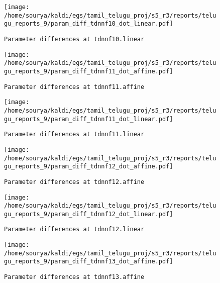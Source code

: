 \documentclass[prl,10pt,twocolumn]{revtex4}
\begin{document}
\newpage
\begin{figure}[h]
  \begin{center}
    \caption{\texttt{Parameter differences at tdnnf10.linear}}
    \texttt{[image: /home/sourya/kaldi/egs/tamil\_telugu\_proj/s5\_r3/reports/telugu\_reports\_9/param\_diff\_tdnnf10\_dot\_linear.pdf]}
  \end{center}
\end{figure}
\clearpage


\newpage
\begin{figure}[h]
  \begin{center}
    \caption{\texttt{Parameter differences at tdnnf11.affine}}
    \texttt{[image: /home/sourya/kaldi/egs/tamil\_telugu\_proj/s5\_r3/reports/telugu\_reports\_9/param\_diff\_tdnnf11\_dot\_affine.pdf]}
  \end{center}
\end{figure}
\clearpage


\newpage
\begin{figure}[h]
  \begin{center}
    \caption{\texttt{Parameter differences at tdnnf11.linear}}
    \texttt{[image: /home/sourya/kaldi/egs/tamil\_telugu\_proj/s5\_r3/reports/telugu\_reports\_9/param\_diff\_tdnnf11\_dot\_linear.pdf]}
  \end{center}
\end{figure}
\clearpage


\newpage
\begin{figure}[h]
  \begin{center}
    \caption{\texttt{Parameter differences at tdnnf12.affine}}
    \texttt{[image: /home/sourya/kaldi/egs/tamil\_telugu\_proj/s5\_r3/reports/telugu\_reports\_9/param\_diff\_tdnnf12\_dot\_affine.pdf]}
  \end{center}
\end{figure}
\clearpage


\newpage
\begin{figure}[h]
  \begin{center}
    \caption{\texttt{Parameter differences at tdnnf12.linear}}
    \texttt{[image: /home/sourya/kaldi/egs/tamil\_telugu\_proj/s5\_r3/reports/telugu\_reports\_9/param\_diff\_tdnnf12\_dot\_linear.pdf]}
  \end{center}
\end{figure}
\clearpage


\newpage
\begin{figure}[h]
  \begin{center}
    \caption{\texttt{Parameter differences at tdnnf13.affine}}
    \texttt{[image: /home/sourya/kaldi/egs/tamil\_telugu\_proj/s5\_r3/reports/telugu\_reports\_9/param\_diff\_tdnnf13\_dot\_affine.pdf]}
  \end{center}
\end{figure}
\clearpage
\end{document}
